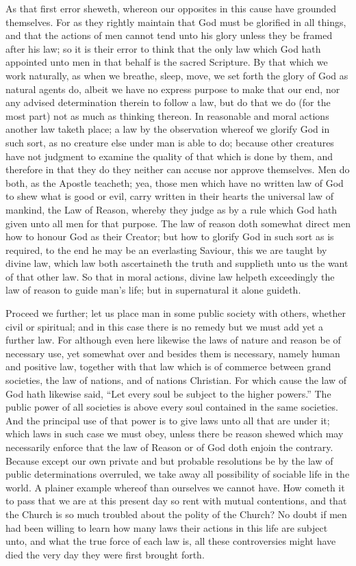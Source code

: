 As that first error sheweth, whereon our opposites in this cause have grounded themselves. For as they rightly maintain that God must be glorified in all things, and that the actions of men cannot tend unto his glory unless they be framed after his law; so it is their error to think that the only law which God hath appointed unto men in that behalf  is the sacred Scripture. By that which we work naturally, as when we breathe, sleep, move, we set forth the glory of God as natural agents do, albeit we have no express purpose to make that our end, nor any advised determination therein to follow a law, but do that we do (for the most part) not as much as thinking thereon. In reasonable and moral actions another law taketh place; a law by the observation whereof we glorify God in such sort, as no creature else under man is able to do; because other creatures have not judgment to examine the quality of that which is done by them, and therefore in that they do they neither can accuse nor approve themselves. Men do both, as the Apostle teacheth; yea, those men which have no written law of God to shew what is good or evil, carry written in their hearts the universal law of mankind, the Law of Reason, whereby they judge as by a rule which God hath given unto all men for that purpose. The law of reason doth somewhat direct men how to honour God as their Creator; but how to glorify God in such sort as is required, to the end he may be an everlasting Saviour, this we are taught by divine law, which law both ascertaineth the truth and supplieth unto us the want of that other law. So that in moral actions, divine law helpeth exceedingly the law of reason to guide man’s life; but in supernatural it alone guideth.

Proceed we further; let us place man in some public society with others, whether civil or spiritual; and in this case there is no remedy but we must add yet a further law. For although even here likewise the laws of nature and reason be of necessary use, yet somewhat over and besides them is necessary, namely human and positive law, together with that law which is of commerce between grand societies, the law of nations, and of nations Christian. For which cause the law of God hath likewise said, “Let every soul be subject to the higher powers.” The public power of all societies is above every soul contained in the same societies. And the principal use of that power is to give laws unto all that are under it; which laws in such case we must obey, unless there be reason shewed which may necessarily enforce that the law of Reason or of God doth enjoin the contrary.  Because except our own private and but probable resolutions be by the law of public determinations overruled, we take away all possibility of sociable life in the world. A plainer example whereof than ourselves we cannot have. How cometh it to pass that we are at this present day so rent with mutual contentions, and that the Church is so much troubled about the polity of the Church? No doubt if men had been willing to learn how many laws their actions in this life are subject unto, and what the true force of each law is, all these controversies might have died the very day they were first brought forth.

